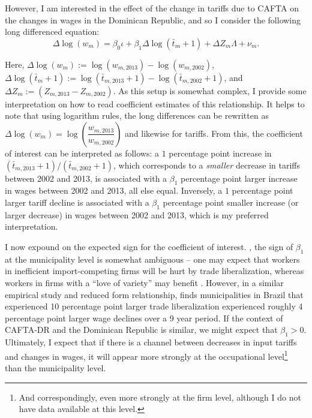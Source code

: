 However, I am interested in the effect of the change in tariffs due to CAFTA on the changes in wages
in the Dominican Republic, and so I consider the following long differenced equation:
\begin{equation}
\label{eq:Equation2}
\Delta\log(w_m) = \beta_0 \iota + \beta_1 \Delta\log(\bar{t}_{m}+1)+ \Delta Z_m \Lambda + \nu_m.
\end{equation}

Here, $\Delta \log(w_m) := \log(w_{m,2013}) - \log(w_{m,2002})$,
$\Delta\log(\bar{t}_{m}+1) := \log(\bar{t}_{m,2013}+1)-\log(\bar{t}_{m,2002}+1)$, 
and $\Delta Z_m :=  (Z_{m, 2013}-Z_{m, 2002})$. As this setup is somewhat complex,
I provide some interpretation on how to read coefficient estimates of this relationship.
It helps to note that using logarithm rules, the long differences can be rewritten as 
$\Delta \log(w_m) = \log \left(\dfrac{w_{m,2013}}{w_{m,2002}} \right)$ and likewise for tariffs.
From this, the coefficient of interest can be interpreted as follows: a $1$ percentage point increase 
in $(\bar{t}_{m,2013}+1)/(\bar{t}_{m,2002}+1)$, which corresponds to a \textit{smaller} decrease in 
tariffs between 2002 and 2013, is associated with a $\beta_1$ percentage point larger increase in wages
between 2002 and 2013, all else equal. Inversely, a $1$ percentage point larger tariff decline is associated
with a $\beta_1$ percentage point smaller increase (or larger decrease) in wages 
between 2002 and 2013, which is my preferred interpretation.

I now expound on the expected sign for the coefficient of interest. , the sign of $\beta_1$ at the 
municipality level is somewhat ambiguous -- one may expect that workers in inefficient import-competing 
firms will be hurt by trade liberalization, whereas workers in firms with a ``love of variety'' may 
benefit \citep{dixit1977monopolistic}. However, in a similar empirical study and reduced form relationship,
\citet{kovak} finds municipalities in Brazil that experienced 10 percentage point larger trade 
liberalization experienced roughly 4 percentage point larger wage declines over a 9 year period.
If the context of CAFTA-DR and the Dominican Republic is similar, we might expect that $\beta_1 > 0$.
Ultimately, I expect that if there is a channel between decreases in input tariffs and changes in
wages, it will appear more strongly at the occupational level\footnote{And correspondingly,
even more strongly at the firm level, although I do not have data available at this level.} 
than the municipality level.

